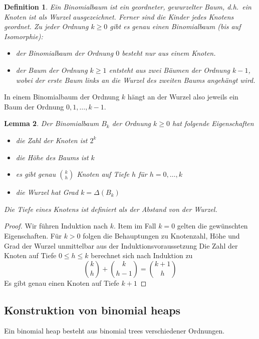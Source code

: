 \documentclass[10pt,reqno]{amsart}
\numberwithin{equation}{section}
\newcommand\alert[1]{\emph{#1}}
\newtheorem{definition}{Definition}[section]
\newtheorem{lemma}[definition]{Lemma}
\begin{document}
\begin{definition}\label{def_binomial_tree}
	Ein Binomialbaum ist ein geordneter, gewurzelter Baum, d.h.\ ein Knoten ist als Wurzel ausgezeichnet.
	Ferner sind die Kinder jedes Knotens geordnet.
	Zu jeder \alert{Ordnung} $k\geq0$ gibt es genau einen Binomialbaum (bis auf Isomorphie):
	\begin{itemize}
		\item der Binomialbaum der Ordnung $0$ besteht nur aus einem Knoten.
		\item der Baum der Ordnung $k\geq1$ entsteht aus zwei B\"aumen der Ordnung $k-1$, wobei der erste Baum links an die Wurzel des zweiten Baums angeh\"angt wird.
	\end{itemize}
\end{definition}

\noindent
In einem Binomialbaum der Ordnung $k$ h\"angt an der Wurzel also jeweils ein Baum der Ordnung $0,1,\ldots,k-1$.

\begin{lemma}\label{lem_binomial_tree}
	Der Binomialbaum $B_k$ der Ordnung $k\geq0$ hat folgende Eigenschaften
	\begin{itemize}
		\item die Zahl der Knoten ist $2^k$
		\item die H\"ohe des Baums ist $k$
		\item es gibt genau $\binom kh$ Knoten auf Tiefe $h$ f\"ur $h=0,\ldots,k$
		\item die Wurzel hat Grad $k=\Delta(B_k)$
	\end{itemize}
	\itshape Die Tiefe eines Knotens ist definiert als der Abstand von der Wurzel.
\end{lemma}
\begin{proof}
	Wir f\"uhren Induktion nach $k$.
	Item im Fall $k=0$ gelten die gew\"unschten Eigenschaften.
	F\"ur $k>0$ folgen die Behauptungen zu Knotenzahl, H\"ohe und Grad der Wurzel unmittelbar aus der Induktionsvoraussetzung
	Die Zahl der Knoten auf Tiefe $0\leq h\leq k$ berechnet sich nach Induktion zu
	$$\binom kh+\binom k{h-1}=\binom{k+1}h$$
	Es gibt genau einen Knoten auf Tiefe $k+1$
\end{proof}

\subsection{Konstruktion von binomial heaps}\label{sec_binomial_heaps}

Ein binomial heap besteht aus binomial trees verschiedener Ordnungen.
\end{document}
